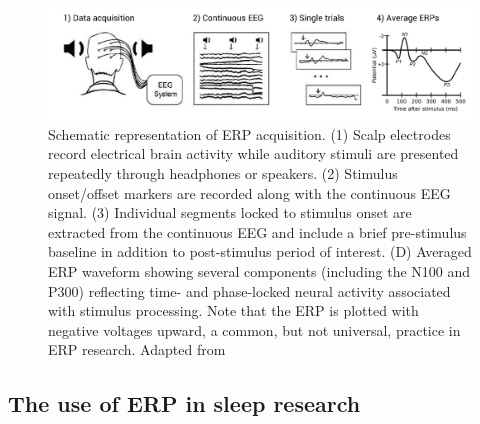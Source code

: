 \begin{figure}[htb]
	\includegraphics[width=\textwidth]{Fig/Methods/ERP/ERP.png}
	\caption[Schematic representation of ERP acquisition]{Schematic representation of ERP acquisition. (1) Scalp electrodes record electrical brain activity while auditory stimuli are presented repeatedly through headphones or speakers. (2) Stimulus onset/offset markers are recorded along with the continuous EEG signal. (3) Individual segments locked to stimulus onset are extracted from the continuous EEG and include a brief pre-stimulus baseline in addition to post-stimulus period of interest. (D) Averaged ERP waveform showing several components (including the N100 and P300) reflecting time- and phase-locked neural activity associated with stimulus processing. Note that the ERP is plotted with negative voltages upward, a common, but not universal, practice in ERP research. Adapted from \citet{key_human_2016}}
	\label{fig:methods:erp}
\end{figure}

\subsection{The use of ERP in sleep research}
\label{sec:eeg:erp:erp}

